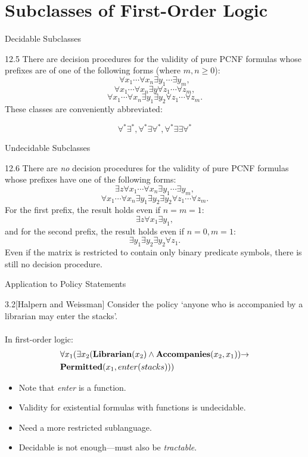 \documentclass[style=sailor,size=12pt]{powerdot}
\begin{document}
\section[]{Subclasses of First-Order Logic}
\begin{slide}[bm=,toc=]{Decidable Subclasses}
\begin{thm}{12.5}
There are decision procedures for the validity of pure PCNF formulas whose
prefixes are of one of the following forms (where $m,n \geq 0$):
\[ \forall x_1\cdots \forall x_n \exists y_1 \cdots \exists y_m, \]
\[ \forall x_1\cdots \forall x_n \exists y \forall z_1 \cdots \forall z_m, \]
\[ \forall x_1\cdots \forall x_n \exists y_1 \exists y_2 \forall z_1 \cdots \forall z_m. \]
\pause
These classes are conveniently abbreviated: 

\[    \forall^*\exists^*, \forall^*\exists \forall^*,   \forall^*\exists \exists \forall^*\]
\end{thm}
\end{slide}

\begin{wideslide}[bm=,toc=]{Undecidable Subclasses}
\begin{thm}{12.6}
There are \emph{no} decision procedures for the validity of pure PCNF formulas whose
prefixes have one of the following forms:
\[ \exists z \forall x_1\cdots \forall x_n \exists y_1 \cdots \exists y_m, \]
\[ \forall x_1\cdots \forall x_n \exists y_1 \exists y_2 \exists y_2 \forall z_1 \cdots \forall z_m. \]
\pause
For the first prefix, the result holds even if $n = m = 1$:
\pause
\[ \exists z \forall x_1 \exists y_1, \]
\pause
and for the second prefix, the result holds even if $n = 0, m = 1$:
\pause
\[ \exists y_1 \exists y_2 \exists y_2 \forall z_1. \]
\pause
Even if the matrix is restricted to contain only binary predicate symbols, there
is still no decision procedure.
\end{thm}
\end{wideslide}

\begin{wideslide}[bm=,toc=]{Application to Policy Statements}
\begin{ex}{3.2}[Halpern and Weissman]
Consider the policy `anyone who is accompanied by a librarian
may enter the stacks'.\\~\\
\pause
In first-order logic:
\begin{align*}
& \forall x_1 (\exists x_2 (\mbox{\bf Librarian}(x_2) \land \mbox{\bf Accompanies}(x_2,x_1)) \mathbin{\rightarrow} \\
& \mbox{\bf Permitted}(x_1, enter(stacks)))
\end{align*}
\end{ex}
\begin{itemize} 
\item<3-> Note that \emph{enter} is a function.
\item<4-> Validity for existential formulas with functions is undecidable. 
\item<5-> Need a more restricted sublanguage.
\item<6-> Decidable is not enough---must also be \emph{tractable}.
\end{itemize}
\end{wideslide}
\end{document}
